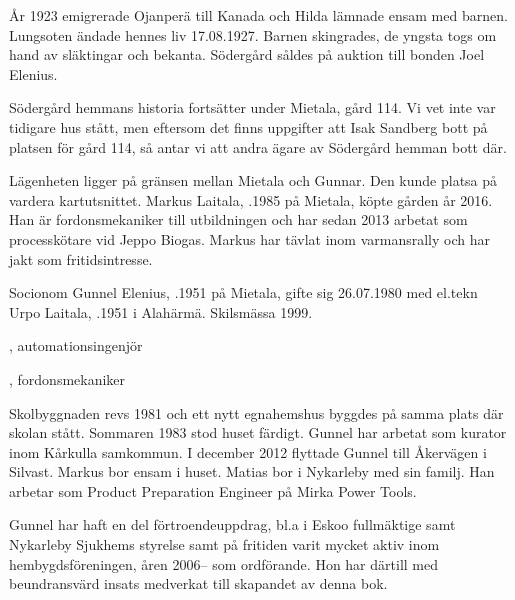 År 1923 emigrerade Ojanperä till Kanada och Hilda lämnade ensam med barnen. Lungsoten ändade hennes liv 17.08.1927. Barnen skingrades, de yngsta togs om hand av släktingar och bekanta. Södergård såldes på auktion till bonden Joel Elenius.

Södergård hemmans historia fortsätter under Mietala, gård 114. Vi vet inte var tidigare hus stått, men eftersom det finns uppgifter att Isak Sandberg bott på platsen för gård 114, så antar vi att andra ägare av Södergård hemman bott där.


%



%
Lägenheten ligger på gränsen mellan Mietala och Gunnar. Den kunde platsa på vardera kartutsnittet. Markus Laitala, .1985 på Mietala, köpte gården år 2016. Han är fordonsmekaniker till utbildningen och har sedan 2013 arbetat som processkötare vid Jeppo Biogas. Markus har tävlat inom varmansrally och har jakt som fritidsintresse.\jhvspace{}



%
Socionom Gunnel Elenius, .1951 på Mietala, gifte sig 26.07.1980 med el.tekn Urpo Laitala, .1951 i Alahärmä. Skilsmässa 1999.
\begin{jhchildren}
  \item {}, automationsingenjör
  \item {}, fordonsmekaniker
\end{jhchildren}

Skolbyggnaden revs 1981 och ett nytt egnahemshus byggdes på samma plats där skolan stått. Sommaren 1983 stod huset färdigt. Gunnel har arbetat som kurator inom Kårkulla samkommun. I december 2012 flyttade Gunnel till Åkervägen i Silvast. Markus bor ensam i huset. Matias bor i Nykarleby med sin familj. Han arbetar som Product Preparation Engineer på Mirka Power Tools.

Gunnel har haft en del förtroendeuppdrag, bl.a i  Eskoo fullmäktige samt Nykarleby Sjukhems styrelse samt på fritiden varit mycket aktiv inom hembygdsföreningen, åren 2006-- som ordförande. Hon har därtill med beundransvärd insats medverkat till skapandet av denna bok.



